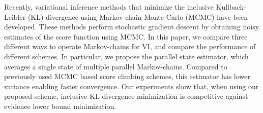 
Recently, variational inference methods that minimize the inclusive Kullback-Leibler (KL) divergence using Markov-chain Monte Carlo (MCMC) have been developed.
These methods perform stochastic gradient descent by obtaining noisy estimates of the score function using MCMC.
In this paper, we compare three different ways to operate Markov-chains for VI, and compare the performance of different schemes.
In particular, we propose the parallel state estimator, which averages a single state of multiple parallel Markov-chains.
Compared to previously used MCMC based score climbing schemes, this estimator has lower variance enabling faster convergence.
Our experiments show that, when using our proposed scheme, inclusive KL divergence minimization is competitive against evidence lower bound minimization.

